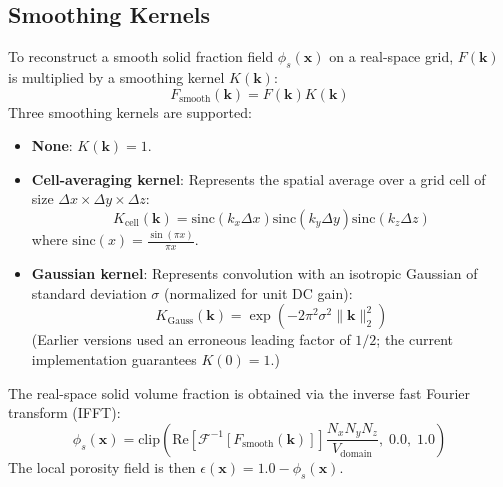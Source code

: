\documentclass[preprint,12pt]{elsarticle}
\newcommand{\x}{\mathbf{x}}
\newcommand{\kvec}{\mathbf{k}}
\begin{document}
\subsection{Smoothing Kernels}
To reconstruct a smooth solid fraction field $\phi_s(\x)$ on a real-space grid, $F(\kvec)$ is multiplied by a smoothing kernel $K(\kvec)$:
\begin{equation}
F_{\text{smooth}}(\kvec) = F(\kvec) K(\kvec)
\end{equation}
Three smoothing kernels are supported:
\begin{itemize}
    \item \textbf{None}: $K(\kvec) = 1$.
    \item \textbf{Cell-averaging kernel}: Represents the spatial average over a grid cell of size $\Delta x \times \Delta y \times \Delta z$:
    \begin{equation}
    K_{\text{cell}}(\kvec) = \text{sinc}(k_x \Delta x) \text{sinc}(k_y \Delta y) \text{sinc}(k_z \Delta z)
    \end{equation}
    where $\text{sinc}(x) = \frac{\sin(\pi x)}{\pi x}$.
    \item \textbf{Gaussian kernel}: Represents convolution with an isotropic Gaussian of standard deviation $\sigma$ (normalized for unit DC gain):
    \begin{equation}
    K_{\text{Gauss}}(\kvec) = \exp(-2\pi^2 \sigma^2 \|\kvec\|_2^2)
    \end{equation}
    (Earlier versions used an erroneous leading factor of $1/2$; the current implementation guarantees $K(0) = 1$.)
\end{itemize}
The real-space solid volume fraction is obtained via the inverse fast Fourier transform (IFFT):
\begin{equation}
\phi_s(\x) = \text{clip}\left( \text{Re} \left[ \mathcal{F}^{-1}[F_{\text{smooth}}(\kvec)] \right] \frac{N_x N_y N_z}{V_{\text{domain}}}, \; 0.0, \; 1.0 \right)
\end{equation}
The local porosity field is then $\epsilon(\x) = 1.0 - \phi_s(\x)$.
\end{document}
